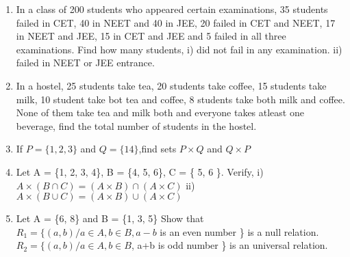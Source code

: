 \documentclass[14pt]{article}
\begin{document}
\begin{multicols}{2}
\begin{enumerate}[resume]
\item In a class of 200 students who appeared
certain examinations, 35 students failed
in CET, 40 in NEET and 40 in JEE,
20 failed in CET and NEET, 17 in NEET
and JEE, 15 in CET and JEE and 5 failed
in all three examinations. Find how many
students,
i)	did not fail in any examination.
ii) failed in NEET or JEE entrance.
		 
		 
\item In a hostel, 25 students take tea, 20 students
take coffee, 15 students take milk, 10
student take bot tea and coffee, 8 students
take both milk and coffee. None of them
take tea and milk both and everyone takes
atleast one beverage, find the total number
of students in the hostel.

\item If $P = \{1, 2, 3 \} $ and $Q = \{14 \}$,find sets $P \times Q $ and $Q \times P$

\item Let A = \{1, 2, 3, 4\}, B = \{4, 5, 6\}, C = \{ 5, 6 \}.
 Verify, i) $A \times (B \cap C) = (A \times B) \cap (A \times C)$				
ii) $ A \times (B \cup C) = (A \times B) \cup (A \times C)$

\item Let A = \{6, 8\} and B = \{1, 3, 5\} Show that $ R_1 = \{ (a, b) / a \in A, b\in B, a - b$
is an even number \} is a null relation.
$R_2 = \{(a, b)/a \in A, b \in B$, a+b is odd number \}
is an universal relation.
\end{enumerate} 



\end{multicols}
 
\end{document}
